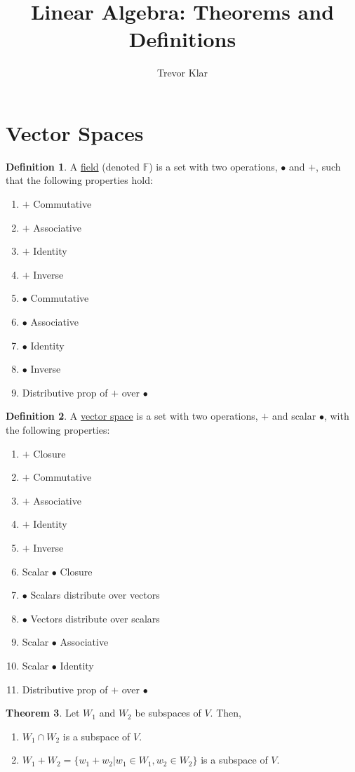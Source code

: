 \documentclass[a5paper]{article}
\title{Linear Algebra: Theorems and Definitions}
\author{Trevor Klar}
\theoremstyle{definition}%
\newtheorem{theorem}{Theorem}
\numberwithin{theorem}{section} %
\newtheorem{definition}[theorem]{Definition}
\newcommand{\F}{\mathbb{F}}
\begin{document}
\maketitle

\section{Vector Spaces}

\begin{definition}
A \underline{field} (denoted $\F$) is a set with two operations, $\bullet$ and $+$, such that the following properties hold:
\begin{enumerate}
\item $+$ Commutative
\item $+$ Associative
\item $+$ Identity
\item $+$ Inverse
\item $\bullet$ Commutative
\item $\bullet$ Associative
\item $\bullet$ Identity
\item $\bullet$ Inverse
\item Distributive prop of $+$ over $\bullet$ 
\end{enumerate}
\end{definition}

\begin{definition}
A \underline{vector space} is a set with two operations, $+$ and scalar $\bullet$, with the following properties:
\begin{enumerate}
\item $+$ Closure
\item $+$ Commutative
\item $+$ Associative
\item $+$ Identity
\item $+$ Inverse
\item Scalar $\bullet$ Closure
\item $\bullet$ Scalars distribute over vectors
\item $\bullet$ Vectors distribute over scalars
\item Scalar $\bullet$ Associative
\item Scalar $\bullet$ Identity
\item Distributive prop of $+$ over $\bullet$ 
\end{enumerate}
\end{definition}

\begin{theorem}
Let $W_1$ and $W_2$ be subspaces of $V$. Then,
\begin{enumerate}
\item $W_1 \cap W_2$ is a subspace of $V$.
\item $W_1 + W_2 = \{w_1 + w_2 | w_1 \in W_1, w_2 \in W_2\}$ is a subspace of $V$.  
\end{enumerate}
\end{theorem}
\end{document}
